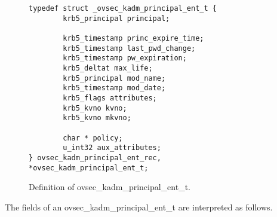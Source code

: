\begin{figure}[htbp]
\begin{verbatim}
typedef struct _ovsec_kadm_principal_ent_t {
        krb5_principal principal;

        krb5_timestamp princ_expire_time;
        krb5_timestamp last_pwd_change;
        krb5_timestamp pw_expiration;
        krb5_deltat max_life;
        krb5_principal mod_name;
        krb5_timestamp mod_date;
        krb5_flags attributes;
        krb5_kvno kvno;
        krb5_kvno mkvno;

        char * policy;
        u_int32 aux_attributes;
} ovsec_kadm_principal_ent_rec, *ovsec_kadm_principal_ent_t;
\end{verbatim}
\caption{Definition of ovsec_kadm_principal_ent_t.}
\label{fig:princ-t}
\end{figure}

The fields of an ovsec_kadm_principal_ent_t are interpreted as
follows.

